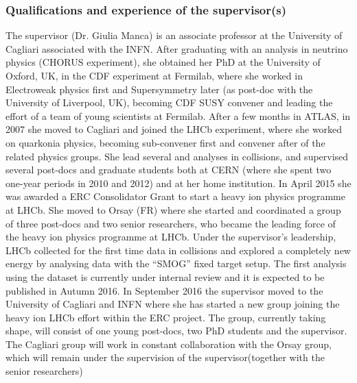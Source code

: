 \documentclass[a4paper,11pt]{article}
\newcommand{\supervisor}{the supervisor}
\begin{document}
\subsubsection{Qualifications and experience of the supervisor(s)}

% 

The supervisor (Dr. Giulia Manca) is an associate professor at the 
University of Cagliari associated with the INFN. After graduating with an 
analysis in neutrino physics (CHORUS experiment), she obtained her 
PhD at the University of Oxford, UK, in the CDF experiment at Fermilab,
where she worked in Electroweak physics first and Supersymmetry later
(as post-doc with the University of Liverpool, UK), becoming 
CDF SUSY convener and leading the effort of a team of young scientists
at Fermilab.
After a few months in ATLAS, in 2007 she moved to Cagliari and 
joined the LHCb experiment, where she worked on quarkonia physics, 
becoming sub-convener first and convener after of the related physics groups.
She lead several \Jpsi and \PgU analyses in \pp
collisions, and supervised several post-docs and graduate 
students both at CERN (where she spent two one-year periods
in 2010 and 2012) and at her home institution. In April 2015 she
was awarded a ERC Consolidator Grant to start a heavy ion physics 
programme at LHCb. She moved to Orsay (FR) 
where she started and coordinated a group of three post-docs and 
two senior researchers, who became the leading force of the 
heavy ion physics programme at LHCb. Under \supervisor's 
leadership, LHCb collected for the first time data in \PbPb 
collisions and explored a completely new energy by analysing
data with the ``SMOG'' fixed target setup.
The first analysis using the \PbPb dataset is currently under internal review
and it is expected to be published in Autumn 2016. 
In September 2016 \supervisor 
moved to the University of Cagliari and INFN where 
she has started a new group joining the heavy ion LHCb effort within 
the ERC project. The group, currently taking shape, will consist
of one young post-docs, two PhD students and \supervisor. The Cagliari group will work 
in constant collaboration with the Orsay group, which will remain 
under the supervision of \supervisor (together with the senior researchers)
\end{document}
